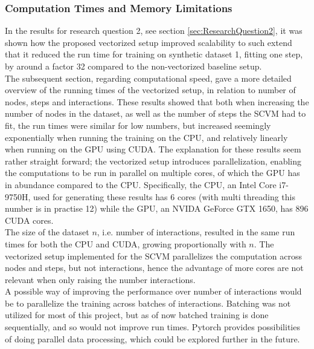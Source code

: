 \subsubsection{Computation Times and Memory Limitations}
\label{sec:Discussion:Results:ComputationSpeed}
In the results for research question 2, see section \ref{sec:ResearchQuestion2}, it was shown how the proposed vectorized setup improved scalability to such extend that it reduced the run time for training on synthetic dataset 1, fitting one step, by around a factor 32 compared to the non-vectorized baseline setup.
\\
The subsequent section, regarding computational speed, gave a more detailed overview of the running times of the vectorized setup, in relation to number of nodes, steps and interactions.
These results showed that both when increasing the number of nodes in the dataset, as well as the number of steps the SCVM had to fit, the run times were similar for low numbers, but increased seemingly exponentially when running the training on the CPU, and relatively linearly when running on the GPU using CUDA.
The explanation for these results seem rather straight forward; the vectorized setup introduces parallelization, enabling the computations to be run in parallel on multiple cores, of which the GPU has in abundance compared to the CPU. 
Specifically, the CPU, an Intel Core i7-9750H, used for generating these results has 6 cores (with multi threading this number is in practise 12) while the GPU, an NVIDA GeForce GTX 1650, has 896 CUDA cores.
\\
The size of the dataset $n$, i.e. number of interactions, resulted in the same run times for both the CPU and CUDA, growing proportionally with $n$.
The vectorized setup implemented for the SCVM parallelizes the computation across nodes and steps, but not interactions, hence the advantage of more cores are not relevant when only raising the number interactions. 
\\
A possible way of improving the performance over number of interactions would be to parallelize the training across batches of interactions. 
Batching was not utilized for most of this project, but as of now batched training is done sequentially, and so would not improve run times.
Pytorch provides possibilities of doing parallel data processing, which could be explored further in the future. 


